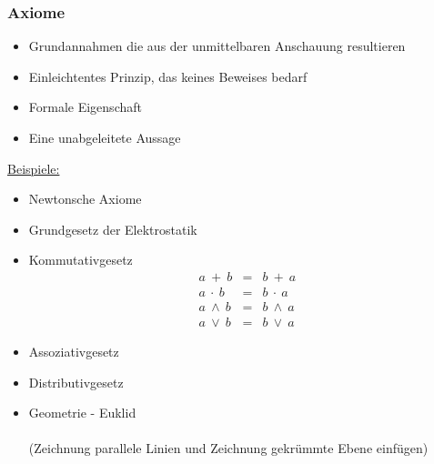         \subsubsection{Axiome}
            \begin{itemize}[leftmargin=*]
                \item Grundannahmen die aus der unmittelbaren Anschauung resultieren
                \item Einleichtentes Prinzip, das keines Beweises bedarf
                \item Formale Eigenschaft
                \item Eine unabgeleitete Aussage
            \end{itemize}
            \underline{Beispiele:}
            \begin{itemize}[leftmargin=*]
                \item Newtonsche Axiome
                \item Grundgesetz der Elektrostatik
                \item Kommutativgesetz \\
                    \vspace{-0.8cm}
                    \begin{eqnarray*}
                        a \ +     \ b &=& b \ +     \ a \\
                        a \ \cdot \ b &=& b \ \cdot \ a \\
                        a \ \land \ b &=& b \ \land \ a \\
                        a \ \lor  \ b &=& b \ \lor  \ a
                    \end{eqnarray*}
                \item Assoziativgesetz  
                \item Distributivgesetz 
                \item Geometrie - Euklid \\
                    \\ (Zeichnung parallele Linien und Zeichnung gekrümmte Ebene einfügen)
            \end{itemize}
